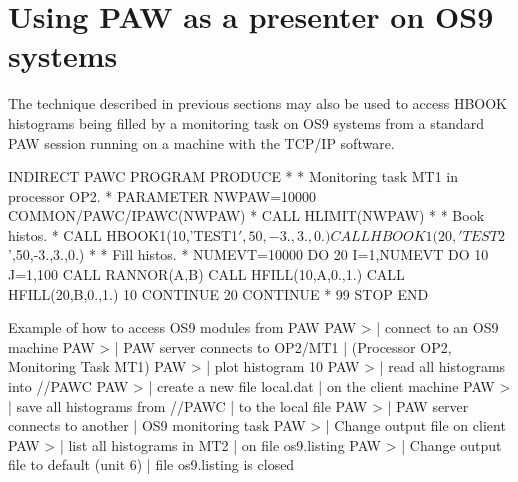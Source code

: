 \section{Using PAW as a presenter on OS9 systems}
 
The technique described in previous sections may also be used
to access HBOOK histograms being filled by a monitoring task
on OS9 systems from a standard PAW session running
on a machine with the TCP/IP software.
 
\begin{minipage}{.42\textwidth}
\begin{XMP}
      INDIRECT PAWC
      PROGRAM PRODUCE
*
*        Monitoring task MT1 in processor OP2.
*
      PARAMETER NWPAW=10000
      COMMON/PAWC/IPAWC(NWPAW)
*
      CALL HLIMIT(NWPAW)
*
*       Book histos.
*
      CALL HBOOK1(10,'TEST1$',50,-3.,3.,0.)
      CALL HBOOK1(20,'TEST2$',50,-3.,3.,0.)
*
*       Fill histos.
*
      NUMEVT=10000
      DO 20 I=1,NUMEVT
         DO 10 J=1,100
            CALL RANNOR(A,B)
            CALL HFILL(10,A,0.,1.)
            CALL HFILL(20,B,0.,1.)
 10      CONTINUE
 20   CONTINUE
*
 99   STOP
      END
\end{XMP}
\end{minipage}\hfill
\begin{minipage}{.56\textwidth}
\begin{Fighere}
\caption{Visualising histograms on OS9 modules from PAW}
\end{Fighere}
\end{minipage}
 
\begin{XMPt}{Example of how to access OS9 modules from PAW}
PAW >                             | connect to an OS9 machine
PAW >                       | PAW server connects to OP2/MT1
                                                 | (Processor OP2, Monitoring Task MT1)
PAW >                               | plot histogram 10
PAW >                                      | read all histograms into //PAWC
PAW >               | create a new file local.dat
                                                 | on the client machine
PAW >                                     | save all histograms from //PAWC
                                                 | to the local file
PAW >                       | PAW server connects to another
                                                 | OS9 monitoring task
PAW >                       | Change output file on client
PAW >                                 | list all histograms in MT2
                                                 | on file os9.listing
PAW >                                 | Change output file to default (unit 6)
                                                 | file os9.listing is closed
\end{XMPt}
